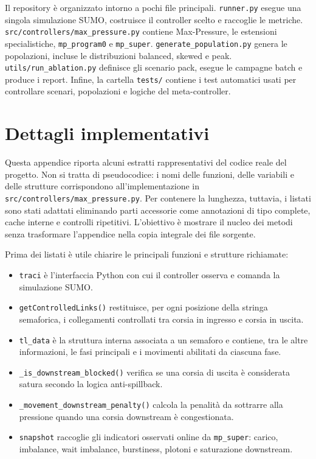 \documentclass[12pt,a4paper,oneside]{report}
\numberwithin{equation}{chapter}
\begin{document}
Il repository è organizzato intorno a pochi file principali. \texttt{runner.py}
esegue una singola simulazione SUMO, costruisce il controller scelto e raccoglie
le metriche. \texttt{src/controllers/max\_pressure.py} contiene Max-Pressure,
le estensioni specialistiche, \texttt{mp\_program0} e \texttt{mp\_super}.
\texttt{generate\_population.py} genera le popolazioni, incluse le
distribuzioni balanced, skewed e peak. \texttt{utils/run\_ablation.py}
definisce gli scenario pack, esegue le campagne batch e produce i report.
Infine, la cartella \texttt{tests/} contiene i test automatici usati per
controllare scenari, popolazioni e logiche del meta-controller.

\chapter{Dettagli implementativi}
\label{app:listati}

Questa appendice riporta alcuni estratti rappresentativi del codice reale del
progetto. Non si tratta di pseudocodice: i nomi delle funzioni, delle variabili
e delle strutture corrispondono all'implementazione in
\texttt{src/controllers/max\_pressure.py}. Per contenere la lunghezza, tuttavia,
i listati sono stati adattati eliminando parti accessorie come annotazioni di
tipo complete, cache interne e controlli ripetitivi. L'obiettivo è mostrare il
nucleo dei metodi senza trasformare l'appendice nella copia integrale dei file
sorgente.

Prima dei listati è utile chiarire le principali funzioni e strutture richiamate:

\begin{itemize}
    \item \texttt{traci} è l'interfaccia Python con cui il controller osserva e
    comanda la simulazione SUMO.
    \item \texttt{getControlledLinks()} restituisce, per ogni posizione della
    stringa semaforica, i collegamenti controllati tra corsia in ingresso e
    corsia in uscita.
    \item \texttt{tl\_data} è la struttura interna associata a un semaforo e
    contiene, tra le altre informazioni, le fasi principali e i movimenti
    abilitati da ciascuna fase.
    \item \texttt{\_is\_downstream\_blocked()} verifica se una corsia di uscita è
    considerata satura secondo la logica anti-spillback.
    \item \texttt{\_movement\_downstream\_penalty()} calcola la penalità da
    sottrarre alla pressione quando una corsia downstream è congestionata.
    \item \texttt{snapshot} raccoglie gli indicatori osservati online da
    \texttt{mp\_super}: carico, imbalance, wait imbalance, burstiness, plotoni e
    saturazione downstream.
\end{itemize}
\end{document}
